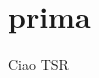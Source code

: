 \documentclass[11pt, a4paper]{article}
\begin{document}
\printnoidxglossaries

\section{prima}
Ciao \acrfull{TSR}
\end{document}
